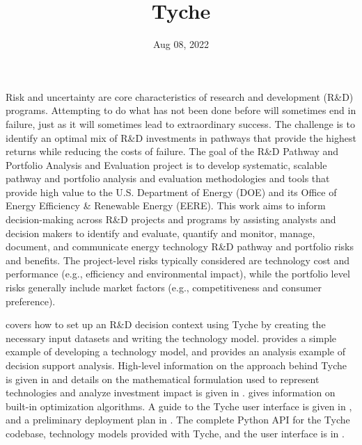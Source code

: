 \documentclass[letterpaper,10pt,english]{sphinxmanual}
\title{Tyche}
\date{Aug 08, 2022}
\author{}
\begin{document}
\pagestyle{empty}
\sphinxmaketitle
\pagestyle{plain}
\sphinxtableofcontents
\pagestyle{normal}
\label{\detokenize{index::doc}}


Risk and uncertainty are core characteristics of research and development (R\&D) programs. Attempting to do what has not been done before will sometimes end in failure, just as it will sometimes lead to extraordinary success. The challenge is to identify an optimal mix of R\&D investments in pathways that provide the highest returns while reducing the costs of failure. The goal of the R\&D Pathway and Portfolio Analysis and Evaluation project is to develop systematic, scalable pathway and portfolio analysis and evaluation methodologies and tools that provide high value to the U.S. Department of Energy (DOE) and its Office of Energy Efficiency \& Renewable Energy (EERE). This work aims to inform decision-making across R\&D projects and programs by assisting analysts and decision makers to identify and evaluate, quantify and monitor, manage, document, and communicate energy technology R\&D pathway and portfolio risks and benefits. The project-level risks typically considered are technology cost and performance (e.g., efficiency and environmental impact), while the portfolio level risks generally include market factors (e.g., competitiveness and consumer preference).

{\hyperref[\detokenize{cheat-sheet:sec-quickstart}]{}} covers how to set up an R\&D decision context using Tyche by creating the necessary input datasets and writing the technology model. {\hyperref[\detokenize{example-technology:sec-techmodelexample}]{}} provides a simple example of developing a technology model, and {\hyperref[\detokenize{example-analysis:sec-analysisexample}]{}} provides an analysis example of decision support analysis. High-level information on the approach behind Tyche is given in {\hyperref[\detokenize{approach:sec-approach}]{}} and details on the mathematical formulation used to represent technologies and analyze investment impact is given in {\hyperref[\detokenize{formulation:sec-formulation}]{}}. {\hyperref[\detokenize{optimizers:sec-optimizers}]{}} gives information on built-in optimization algorithms. A guide to the Tyche user interface is given in {\hyperref[\detokenize{user-interface:sec-userinterface}]{}}, and a preliminary deployment plan in {\hyperref[\detokenize{deployment:sec-deployment}]{}}. The complete Python API for the Tyche codebase, technology models provided with Tyche, and the user interface is in {\hyperref[\detokenize{modules:sec-modules}]{}}.
\end{document}
